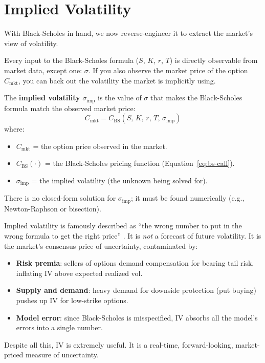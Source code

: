 \section{Implied Volatility}
\label{sec:implied-vol}

With Black-Scholes in hand, we now reverse-engineer it to extract the market's view of volatility.

Every input to the Black-Scholes formula ($S$, $K$, $r$, $T$) is directly observable from market data, except one: $\sigma$.
If you also observe the market price of the option $C_{\text{mkt}}$, you can back out the volatility the market is implicitly using.

\begin{definition}
\label{def:implied-vol}
The \textbf{implied volatility} $\sigma_{\text{imp}}$ is the value of $\sigma$ that makes the Black-Scholes formula match the observed market price:
\begin{equation}
  C_{\text{mkt}} = C_{\text{BS}}(S,\, K,\, r,\, T,\, \sigma_{\text{imp}})
  \label{eq:iv-definition}
\end{equation}
where:
\begin{itemize}[nosep]
  \item $C_{\text{mkt}}$ = the option price observed in the market.
  \item $C_{\text{BS}}(\cdot)$ = the Black-Scholes pricing function (Equation~\ref{eq:bs-call}).
  \item $\sigma_{\text{imp}}$ = the implied volatility (the unknown being solved for).
\end{itemize}
There is no closed-form solution for $\sigma_{\text{imp}}$; it must be found numerically (e.g., Newton-Raphson or bisection).
\end{definition}

\begin{intuition}
Implied volatility is famously described as ``the wrong number to put in the wrong formula to get the right price'' \citep{Rebonato2004}.
It is \emph{not} a forecast of future volatility.
It is the market's consensus price of uncertainty, contaminated by:
\begin{itemize}[nosep]
  \item \textbf{Risk premia}: sellers of options demand compensation for bearing tail risk, inflating IV above expected realized vol.
  \item \textbf{Supply and demand}: heavy demand for downside protection (put buying) pushes up IV for low-strike options.
  \item \textbf{Model error}: since Black-Scholes is misspecified, IV absorbs all the model's errors into a single number.
\end{itemize}
Despite all this, IV is extremely useful. It is a real-time, forward-looking, market-priced measure of uncertainty.
\end{intuition}

